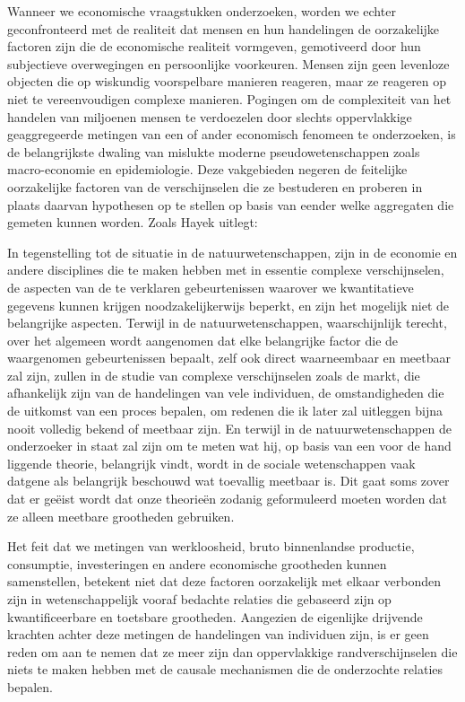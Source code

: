 Wanneer we economische vraagstukken onderzoeken, worden we echter geconfronteerd met de realiteit dat mensen en hun handelingen de oorzakelijke factoren zijn die de economische realiteit vormgeven, gemotiveerd door hun subjectieve overwegingen en persoonlijke voorkeuren. Mensen zijn geen levenloze objecten die op wiskundig voorspelbare manieren reageren, maar ze reageren op niet te vereenvoudigen complexe manieren. Pogingen om de complexiteit van het handelen van miljoenen mensen te verdoezelen door slechts oppervlakkige geaggregeerde metingen van een of ander economisch fenomeen te onderzoeken, is de belangrijkste dwaling van mislukte moderne pseudowetenschappen zoals macro-economie en epidemiologie. Deze vakgebieden negeren de feitelijke oorzakelijke factoren van de verschijnselen die ze bestuderen en proberen in plaats daarvan hypothesen op te stellen op basis van eender welke aggregaten die gemeten kunnen worden. Zoals Hayek uitlegt:

\begin{blockquotebox}
    In tegenstelling tot de situatie in de natuurwetenschappen, zijn in de economie en andere disciplines die te maken hebben met in essentie complexe verschijnselen, de aspecten van de te verklaren gebeurtenissen waarover we kwantitatieve gegevens kunnen krijgen noodzakelijkerwijs beperkt, en zijn het mogelijk niet de belangrijke aspecten. Terwijl in de natuurwetenschappen, waarschijnlijk terecht, over het algemeen wordt aangenomen dat elke belangrijke factor die de waargenomen gebeurtenissen bepaalt, zelf ook direct waarneembaar en meetbaar zal zijn, zullen in de studie van complexe verschijnselen zoals de markt, die afhankelijk zijn van de handelingen van vele individuen, de omstandigheden die de uitkomst van een proces bepalen, om redenen die ik later zal uitleggen bijna nooit volledig bekend of meetbaar zijn. En terwijl in de natuurwetenschappen de onderzoeker in staat zal zijn om te meten wat hij, op basis van een voor de hand liggende theorie, belangrijk vindt, wordt in de sociale wetenschappen vaak datgene als belangrijk beschouwd wat toevallig meetbaar is. Dit gaat soms zover dat er geëist wordt dat onze theorieën zodanig geformuleerd moeten worden dat ze alleen meetbare grootheden gebruiken.\footnotemark
\end{blockquotebox}


Het feit dat we metingen van werkloosheid, bruto binnenlandse productie, consumptie, investeringen en andere economische grootheden kunnen samenstellen, betekent niet dat deze factoren oorzakelijk met elkaar verbonden zijn in wetenschappelijk vooraf bedachte relaties die gebaseerd zijn op kwantificeerbare en toetsbare grootheden. Aangezien de eigenlijke drijvende krachten achter deze metingen de handelingen van individuen zijn, is er geen reden om aan te nemen dat ze meer zijn dan oppervlakkige randverschijnselen die niets te maken hebben met de causale mechanismen die de onderzochte relaties bepalen.

